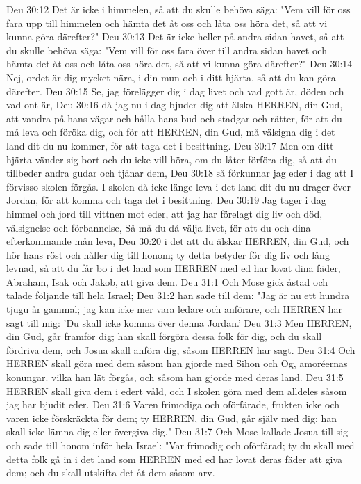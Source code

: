 Deu 30:12  Det är icke i himmelen, så att du skulle behöva säga: "Vem vill för oss fara upp till himmelen och hämta det åt oss och låta oss höra det, så att vi kunna göra därefter?"
Deu 30:13  Det är icke heller på andra sidan havet, så att du skulle behöva säga: "Vem vill för oss fara över till andra sidan havet och hämta det åt oss och låta oss höra det, så att vi kunna göra därefter?"
Deu 30:14  Nej, ordet är dig mycket nära, i din mun och i ditt hjärta, så att du kan göra därefter.
Deu 30:15  Se, jag förelägger dig i dag livet och vad gott är, döden och vad ont är,
Deu 30:16  då jag nu i dag bjuder dig att älska HERREN, din Gud, att vandra på hans vägar och hålla hans bud och stadgar och rätter, för att du må leva och föröka dig, och för att HERREN, din Gud, må välsigna dig i det land dit du nu kommer, för att taga det i besittning.
Deu 30:17  Men om ditt hjärta vänder sig bort och du icke vill höra, om du låter förföra dig, så att du tillbeder andra gudar och tjänar dem,
Deu 30:18  så förkunnar jag eder i dag att I förvisso skolen förgås. I skolen då icke länge leva i det land dit du nu drager över Jordan, för att komma och taga det i besittning.
Deu 30:19  Jag tager i dag himmel och jord till vittnen mot eder, att jag har förelagt dig liv och död, välsignelse och förbannelse, Så må du då välja livet, för att du och dina efterkommande mån leva,
Deu 30:20  i det att du älskar HERREN, din Gud, och hör hans röst och håller dig till honom; ty detta betyder för dig liv och lång levnad, så att du får bo i det land som HERREN med ed har lovat dina fäder, Abraham, Isak och Jakob, att giva dem.
Deu 31:1  Och Mose gick åstad och talade följande till hela Israel;
Deu 31:2  han sade till dem: "Jag är nu ett hundra tjugu år gammal; jag kan icke mer vara ledare och anförare, och HERREN har sagt till mig: 'Du skall icke komma över denna Jordan.'
Deu 31:3  Men HERREN, din Gud, går framför dig; han skall förgöra dessa folk för dig, och du skall fördriva dem, och Josua skall anföra dig, såsom HERREN har sagt.
Deu 31:4  Och HERREN skall göra med dem såsom han gjorde med Sihon och Og, amoréernas konungar. vilka han lät förgås, och såsom han gjorde med deras land.
Deu 31:5  HERREN skall giva dem i edert våld, och I skolen göra med dem alldeles såsom jag har bjudit eder.
Deu 31:6  Varen frimodiga och oförfärade, frukten icke och varen icke förskräckta för dem; ty HERREN, din Gud, går själv med dig; han skall icke lämna dig eller övergiva dig."
Deu 31:7  Och Mose kallade Josua till sig och sade till honom inför hela Israel: "Var frimodig och oförfärad; ty du skall med detta folk gå in i det land som HERREN med ed har lovat deras fäder att giva dem; och du skall utskifta det åt dem såsom arv.
